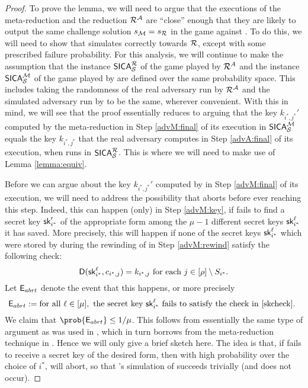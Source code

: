 \begin{proof}
  To prove the lemma,
  we will need to argue that the executions of the meta-reduction \redM
  and the reduction \(\redR^{\advA}\) are ``close'' enough
  that they are likely to output the same challenge solution \(s_{\redM} = s_{\redR}\)
  in the \SICA game against \Simple.
  To do this, we will need to show that \redM simulates \advA
  correctly towards \(\redR\), except with some prescribed failure probability.
  For this analysis, we will continue to make the assumption that
  the instance \(\SICA_{\Simple}^{\redR}\) of the \SICA game played by \(\redR^{A}\)
  and the instance \(\mathsf{SICA}_{\mathcal{S}}^{\mathcal{M}}\) of the \SICA game played by \redM
  are defined over the same probability space.
  This includes taking the randomness of the real adversary
  \advA run by \(\redR^{\advA}\)
  and the simulated adversary run by \redM to be the same,
  wherever convenient.
  With this in mind, we will see that
  the proof essentially reduces to arguing that
  the key \(k_{i^{*},j^{*}}'\) computed by the meta-reduction
  \redM in Step \ref{advM:final} of its execution in \(\mathsf{SICA}_{\mathcal{S}}^{\mathcal{M}}\)
  equals the key \(k_{i^{*},j^{*}}\)
  that the real adversary \advA computes in Step \ref{advA:final} of its execution,
  when \redR runs \advA in \(\SICA_{\Simple}^{\redR}\).
  This is where we will need to make use of Lemma \ref{lemma:equiv}.

  Before we can argue about the key \(k_{i^{*},j^{*}}'\) computed by
  \redM in Step \ref{advM:final} of its execution,
  we will need to address the possibility that \redM aborts
  before ever reaching this step.
  Indeed, this can happen (only) in Step \ref{advM:key},
  if \redM fails to find a secret key \(\mathsf{sk}_{i^{*}}'\)
  of the appropriate form among the \(\mu - 1\)
  different secret keys \(\mathsf{sk}_{i^{*}}^{\ell}\) it has saved.
  More precisely, this will happen if
  none of the secret keys \(\mathsf{sk}_{i^{*}}^{\ell}\)
  which were stored by \redM during the rewinding of \redR in Step \ref{advM:rewind}
  satisfy the following check:
  \begin{equation}\label{skcheck}
  \mathsf{D}(\mathsf{sk}_{i^{*}}^{\ell},c_{i^{*},j}) = k_{i^{*},j}
  \text{ for each } j \in [\rho] \setminus S_{i^{*}}.
  \end{equation}
  Let \(\mathsf{E}_{abrt}\) denote the event that this happens, or more precisely
  \[
    \mathsf{E}_{abrt} := \text{for all } \ell \in [\mu],
    \text{ the secret key } \mathsf{sk}_{i^{*}}^{\ell}
    \text{ fails to satisfy the check in \eqref{skcheck}. }
  \]
  We claim that \(\prob{\eventE_{abrt}} \le 1/\mu\).
  This follows from essentially the same type of argument as was used
  in , which in turn borrows from the
  meta-reduction technique in \cite{EC:BJLS16}.
  Hence we will only give a brief sketch here.
  The idea is that, if \redM fails to receive a secret key of the desired form,
  then with high probability over the choice of \(i^{*}\), \advA{} will abort,
  so that \redM's simulation of \advA succeeds trivially (and  does not occur).


\end{proof}
